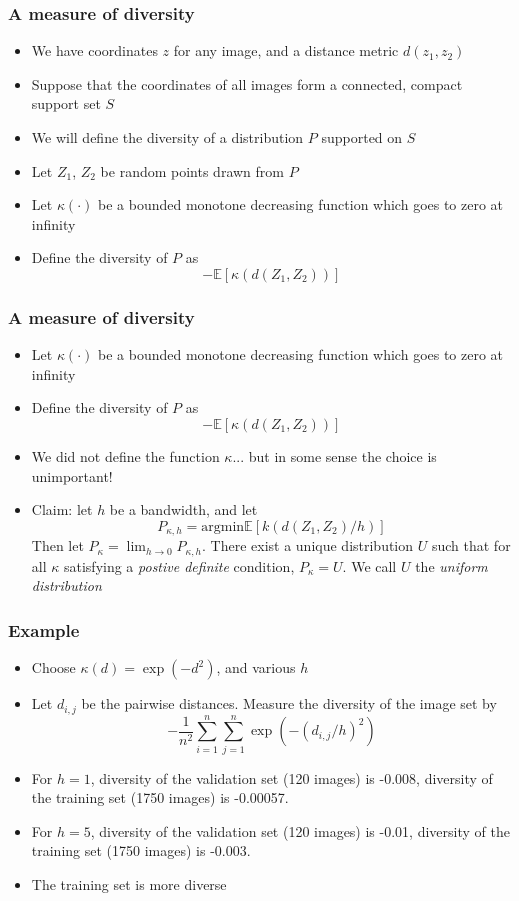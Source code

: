 \documentclass{beamer}
\begin{document}
\begin{frame}
\frametitle{A measure of diversity}
\begin{itemize}
\item We have coordinates $z$ for any image, and a distance metric $d(z_1, z_2)$
\item Suppose that the coordinates of all images form a connected, compact support set $S$
\item We will define the diversity of a distribution $P$ supported on $S$
\item Let $Z_1$, $Z_2$ be random points drawn from $P$
\item Let $\kappa(\cdot)$ be a bounded monotone decreasing function which goes to zero at infinity
\item Define the diversity of $P$ as
\[
-\mathbb{E}[\kappa(d(Z_1, Z_2))]
\]
\end{itemize}
\end{frame}

\begin{frame}
\frametitle{A measure of diversity}
\begin{itemize}
\item Let $\kappa(\cdot)$ be a bounded monotone decreasing function which goes to zero at infinity
\item Define the diversity of $P$ as
\[
-\mathbb{E}[\kappa(d(Z_1, Z_2))]
\]
\item We did not define the function $\kappa$... but in some sense the choice is unimportant!
\item Claim: let $h$ be a bandwidth, and let 
\[P_{\kappa, h} = \text{argmin} \mathbb{E}[k(d(Z_1, Z_2)/h)]\]
Then let $P_\kappa = \lim_{h \to 0} P_{\kappa, h}$.
There exist a unique distribution $U$ such that for all $\kappa$ satisfying a \emph{postive definite} condition, $P_\kappa = U$.
We call $U$ the \emph{uniform distribution}
\end{itemize}
\end{frame}

\begin{frame}
\frametitle{Example}
\begin{itemize}
\item Choose $\kappa(d) = \exp(-d^2)$, and various $h$
\item Let $d_{i,j}$ be the pairwise distances.
Measure the diversity of the image set by
\[
-\frac{1}{n^2} \sum_{i=1}^n \sum_{j = 1}^n \exp(-(d_{i,j}/h)^2)
\]
\item For $h=1$, diversity of the validation set (120 images) is -0.008,
diversity of the training set (1750 images) is -0.00057.
\item For $h=5$, diversity of the validation set (120 images) is -0.01,
diversity of the training set (1750 images) is -0.003.
\item The training set is more diverse
\end{itemize}
\end{frame}
\end{document}
